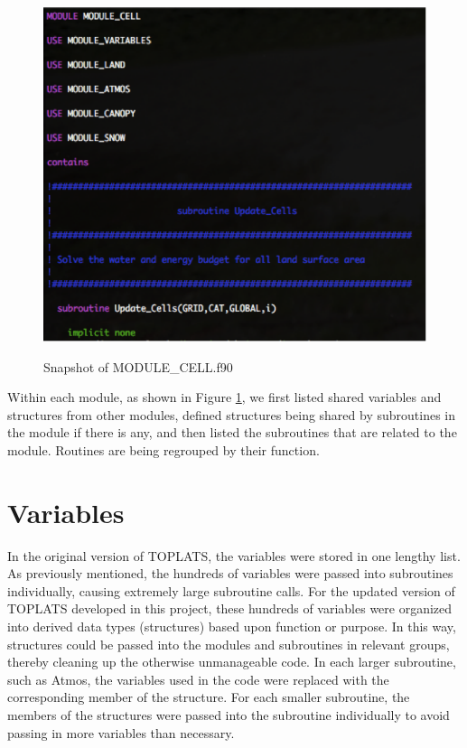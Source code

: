 \documentclass[pdftex,12pt,a4paper]{article}
\begin{document}
\begin{figure}[h]
	\centering
	\includegraphics[width=4.5in]{Figures/Modules2.png}
	\label{Modules2}
	\caption{Snapshot of MODULE\_CELL.f90}
\end{figure}

Within each module, as shown in Figure \ref{Modules2}, we first listed shared variables and structures from other modules, defined structures being shared by subroutines in the module if there is any, and then listed the subroutines that are related to the module. Routines are being regrouped by their function. 

\section{Variables}
In the original version of TOPLATS, the variables were stored in one lengthy list. As previously mentioned, the hundreds of variables were passed into subroutines individually, causing extremely large subroutine calls. For the updated version of TOPLATS developed in this project, these hundreds of variables were organized into derived data types (structures) based upon function or purpose. In this way, structures could be passed into the modules and subroutines in relevant groups, thereby cleaning up the otherwise unmanageable code. In each larger subroutine, such as Atmos, the variables used in the code were replaced with the corresponding member of the structure. For each smaller subroutine, the members of the structures were passed into the subroutine individually to avoid passing in more variables than necessary.
\end{document}
